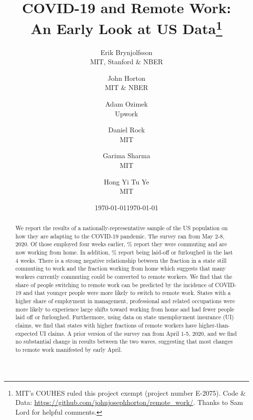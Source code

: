 \documentclass[12pt]{article}
\newcommand{\covid}{COVID-19}
\begin{document}
 



\title{COVID-19 and Remote Work:\\ An Early Look at US Data\footnote{
    MIT's COUHES ruled this project exempt (project number E-2075).
    {Code \& Data: \href{https://github.com/johnjosephhorton/remote\_work/}{https://github.com/johnjosephhorton/remote\_work/}}.
    Thanks to Sam Lord for helpful comments. 
  }}

\date{\today}

\date{\today}

\author{Erik Brynjolfsson\\MIT, Stanford \& NBER \and John Horton\\MIT \& NBER \and Adam Ozimek\\Upwork \and Daniel Rock\\MIT \and Garima Sharma\\MIT \and Hong Yi Tu Ye\\MIT}


\maketitle

\begin{abstract}
  \noindent 
  We report the results of a nationally-representative sample of the US population on how they are adapting to the \covid{} pandemic.
  The survey ran from May 2-8, 2020.
  Of those employed four weeks earlier, \WFH{}\% report they were commuting and are now working from home.
  In addition, \LaidOff{}\% report being laid-off or furloughed in the last 4 weeks. There is a strong negative relationship between the fraction in a state still commuting to work and the fraction working from home which suggests that many workers currently commuting could be converted to remote workers.  We find that the share of people switching to remote work can be predicted  by the incidence of \covid{} and that younger people were more likely to switch to remote work.  States with a higher share of employment in management, professional and related occupations were more likely to experience large shifts toward working from home and had fewer people laid off or furloughed.
  Furthermore, using data on state unemployment insurance (UI) claims, we find that states with higher fractions of remote workers have higher-than-expected UI claims. A prior version of the survey ran from April 1-5, 2020, and we find no substantial change in results between the two waves, suggesting that most changes to remote work manifested by early April.
  \newline 
\end{abstract} 
\end{document}
